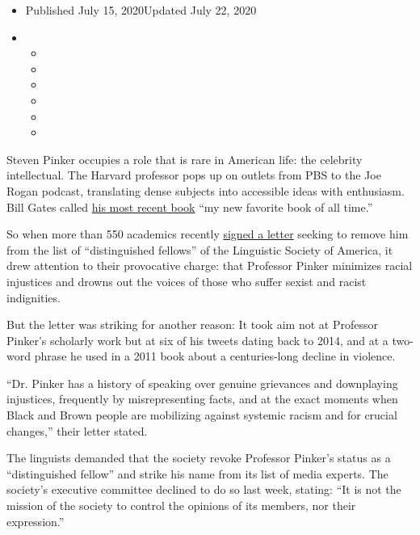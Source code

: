 \begin{itemize}
\item
  Published July 15, 2020Updated July 22, 2020
\item
  \begin{itemize}
  \item
  \item
  \item
  \item
  \item
  \item
  \end{itemize}
\end{itemize}

Steven Pinker occupies a role that is rare in American life: the
celebrity intellectual. The Harvard professor pops up on outlets from
PBS to the Joe Rogan podcast, translating dense subjects into accessible
ideas with enthusiasm. Bill Gates called
\href{https://stevenpinker.com/publications/enlightenment-now-case-reason-science-humanism-and-progress}{his
most recent book} ``my new favorite book of all time.''

So when more than 550 academics recently
\href{https://docs.google.com/document/u/1/d/17ZqWl5grm_F5Kn_0OarY9Q2jlOnk200PvhM5e3isPvY/mobilebasic?urp=gmail_link}{signed
a letter} seeking to remove him from the list of ``distinguished
fellows'' of the Linguistic Society of America, it drew attention to
their provocative charge: that Professor Pinker minimizes racial
injustices and drowns out the voices of those who suffer sexist and
racist indignities.

But the letter was striking for another reason: It took aim not at
Professor Pinker's scholarly work but at six of his tweets dating back
to 2014, and at a two-word phrase he used in a 2011 book about a
centuries-long decline in violence.

``Dr. Pinker has a history of speaking over genuine grievances and
downplaying injustices, frequently by misrepresenting facts, and at the
exact moments when Black and Brown people are mobilizing against
systemic racism and for crucial changes,'' their letter stated.

The linguists demanded that the society revoke Professor Pinker's status
as a ``distinguished fellow'' and strike his name from its list of media
experts. The society's executive committee declined to do so last week,
stating: ``It is not the mission of the society to control the opinions
of its members, nor their expression.''

